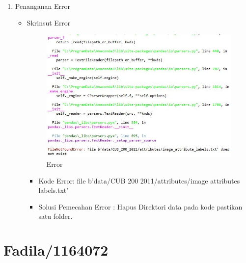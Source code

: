 \begin{enumerate}
\item Penanganan Error
\begin{itemize}
\item Skrinsut Error
\par
\begin{figure}[ht]
\centering
\includegraphics[scale=0.7]{figures/Error.jpg}
\caption{Error}
\label{contoh}
\end{figure}
\par
\begin{itemize}
\item Kode Error: file b'data/CUB 200 2011/attributes/image attributes labels.txt'
\par 
\item Solusi Pemecahan Error : Hapus Direktori data pada kode pastikan satu folder.
\par 
\par
\end{itemize}
\end{itemize}

\end{enumerate}



\section{Fadila/1164072}

